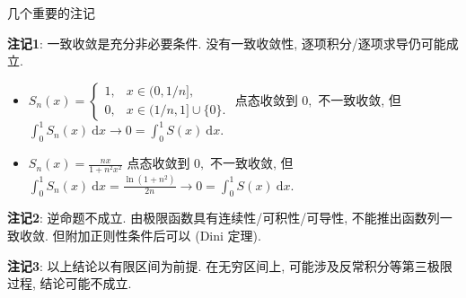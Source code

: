 
\begin{frame}{几个重要的注记}

{\color{red}} \textbf{注记1}: 一致收敛是充分非必要条件. 没有一致收敛性, 逐项积分/逐项求导仍可能成立.

\pause
\vspace{0.5em}

\begin{eg}[可积性不需要一致收敛]
\begin{itemize}
\item $S_n(x) = \begin{cases} 1, & x \in (0, 1/n], \\ 0, & x \in (1/n, 1] \cup \{0\}. \end{cases}$ 点态收敛到 $0,$ 不一致收敛, 但 $\int_0^1 S_n(x) ~ \mathrm{d}x \to 0 = \int_0^1 S(x) ~ \mathrm{d}x.$
\pause
\item $S_n(x) = \frac{nx}{1+n^2x^2}$ 点态收敛到 $0,$ 不一致收敛, 但 $\int_0^1 S_n(x) ~ \mathrm{d}x = \frac{\ln(1+n^2)}{2n} \to 0 = \int_0^1 S(x) ~ \mathrm{d}x.$
\end{itemize}
\end{eg}

\pause

{\color{red}} \textbf{注记2}: 逆命题不成立. 由极限函数具有连续性/可积性/可导性, 不能推出函数列一致收敛. 但附加正则性条件后可以 (Dini 定理).

\pause
\vspace{0.5em}

{\color{red}} \textbf{注记3}: 以上结论以{\color{red}有限区间}为前提. 在无穷区间上, 可能涉及反常积分等第三极限过程, 结论可能不成立.

\end{frame}


